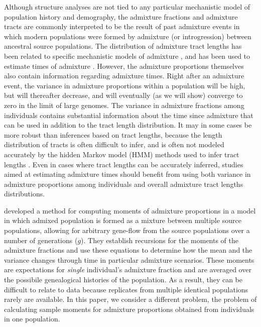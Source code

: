 \documentclass[11pt]{amsart}
\begin{document}
Although structure analyses are not tied to any particular mechanistic model of population history and demography, the admixture fractions and admixture tracts are commonly interpreted to be the result of past admixture events in which modern populations were formed by admixture (or introgression) between ancestral source populations. The distribution of admixture tract lengths has been related to specific mechanistic models of admixture \citep{falush2003inference,tang2006reconstructing,pool2009inference}, and has been used to estimate times of admixture \citep{gravel2012population}. However, the admixture proportions themselves also contain information regarding admixture times. Right after an admixture event, the variance in admixture proportions within a population will be high, but will thereafter decrease, and will eventually (as we will show) converge to zero in the limit of large genomes.  
The variance in admixture fractions among individuals contains substantial information about the time since admixture that can be used in addition to the tract length distribution.  
It may in some cases be more robust than inferences based on tract lengths, because the length distribution of tracts is often difficult to infer, and is often not modeled accurately by the hidden Markov model (HMM) methods used to infer tract lengths \citep{liang2014lengths}.
Even in cases where tract lengths can be accurately inferred, studies aimed at estimating admixture times should benefit from using both variance in admixture proportions among individuals and overall admixture tract lengths distributions.  

\citet{verdu2011general} developed a method for computing moments of admixture proportions in a model in which admixed population is formed as a mixture between multiple source populations, allowing for arbitrary gene-flow from the source populations over a number of generations ($g$). They establish recursions for the moments of the admixture fractions and use these equations to determine how the mean and the variance changes through time in particular admixture scenarios. These moments are expectations for \textit{single} individual's admixture fraction and are averaged over the possibile genealogical histories of the population. As a result, they can be difficult to relate to data because replicates from multiple identical populations rarely are available. In this paper, we consider a different problem, the problem of calculating sample moments for admixture proportions obtained from individuals in one population. 
\end{document}
